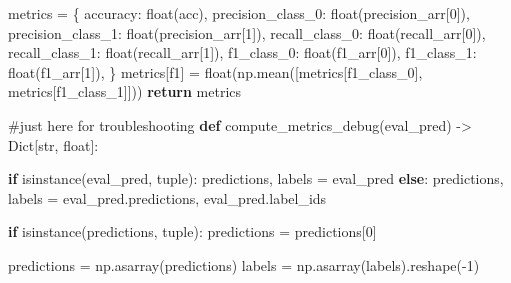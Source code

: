 \documentclass[
  letterpaper,
  DIV=11,
  numbers=noendperiod]{scrartcl}
\newenvironment{Shaded}{\begin{snugshade}}{\end{snugshade}}
\newcommand{\BuiltInTok}[1]{\textcolor[rgb]{0.00,0.23,0.31}{#1}}
\newcommand{\CommentTok}[1]{\textcolor[rgb]{0.37,0.37,0.37}{#1}}
\newcommand{\ControlFlowTok}[1]{\textcolor[rgb]{0.00,0.23,0.31}{\textbf{#1}}}
\newcommand{\DecValTok}[1]{\textcolor[rgb]{0.68,0.00,0.00}{#1}}
\newcommand{\KeywordTok}[1]{\textcolor[rgb]{0.00,0.23,0.31}{\textbf{#1}}}
\newcommand{\NormalTok}[1]{\textcolor[rgb]{0.00,0.23,0.31}{#1}}
\newcommand{\OperatorTok}[1]{\textcolor[rgb]{0.37,0.37,0.37}{#1}}
\newcommand{\StringTok}[1]{\textcolor[rgb]{0.13,0.47,0.30}{#1}}
\begin{document}
\begin{Shaded}
\begin{Highlighting}[]
\NormalTok{    metrics }\OperatorTok{=}\NormalTok{ \{}
        \StringTok{\textquotesingle{}accuracy\textquotesingle{}}\NormalTok{: }\BuiltInTok{float}\NormalTok{(acc),}
        \StringTok{\textquotesingle{}precision\_class\_0\textquotesingle{}}\NormalTok{: }\BuiltInTok{float}\NormalTok{(precision\_arr[}\DecValTok{0}\NormalTok{]),}
        \StringTok{\textquotesingle{}precision\_class\_1\textquotesingle{}}\NormalTok{: }\BuiltInTok{float}\NormalTok{(precision\_arr[}\DecValTok{1}\NormalTok{]),}
        \StringTok{\textquotesingle{}recall\_class\_0\textquotesingle{}}\NormalTok{: }\BuiltInTok{float}\NormalTok{(recall\_arr[}\DecValTok{0}\NormalTok{]),}
        \StringTok{\textquotesingle{}recall\_class\_1\textquotesingle{}}\NormalTok{: }\BuiltInTok{float}\NormalTok{(recall\_arr[}\DecValTok{1}\NormalTok{]),}
        \StringTok{\textquotesingle{}f1\_class\_0\textquotesingle{}}\NormalTok{: }\BuiltInTok{float}\NormalTok{(f1\_arr[}\DecValTok{0}\NormalTok{]),}
        \StringTok{\textquotesingle{}f1\_class\_1\textquotesingle{}}\NormalTok{: }\BuiltInTok{float}\NormalTok{(f1\_arr[}\DecValTok{1}\NormalTok{]),}
\NormalTok{    \}}
\NormalTok{    metrics[}\StringTok{\textquotesingle{}f1\textquotesingle{}}\NormalTok{] }\OperatorTok{=} \BuiltInTok{float}\NormalTok{(np.mean([metrics[}\StringTok{\textquotesingle{}f1\_class\_0\textquotesingle{}}\NormalTok{], metrics[}\StringTok{\textquotesingle{}f1\_class\_1\textquotesingle{}}\NormalTok{]]))}
    \ControlFlowTok{return}\NormalTok{ metrics}


\CommentTok{\#just here for troubleshooting}
\KeywordTok{def}\NormalTok{ compute\_metrics\_debug(eval\_pred) }\OperatorTok{{-}\textgreater{}}\NormalTok{ Dict[}\BuiltInTok{str}\NormalTok{, }\BuiltInTok{float}\NormalTok{]:}

    \ControlFlowTok{if} \BuiltInTok{isinstance}\NormalTok{(eval\_pred, }\BuiltInTok{tuple}\NormalTok{):}
\NormalTok{        predictions, labels }\OperatorTok{=}\NormalTok{ eval\_pred}
    \ControlFlowTok{else}\NormalTok{:}
\NormalTok{        predictions, labels }\OperatorTok{=}\NormalTok{ eval\_pred.predictions, eval\_pred.label\_ids}


    \ControlFlowTok{if} \BuiltInTok{isinstance}\NormalTok{(predictions, }\BuiltInTok{tuple}\NormalTok{):}
\NormalTok{        predictions }\OperatorTok{=}\NormalTok{ predictions[}\DecValTok{0}\NormalTok{]}

\NormalTok{    predictions }\OperatorTok{=}\NormalTok{ np.asarray(predictions)}
\NormalTok{    labels }\OperatorTok{=}\NormalTok{ np.asarray(labels).reshape(}\OperatorTok{{-}}\DecValTok{1}\NormalTok{)}


\end{Highlighting}
\end{Shaded}
\end{document}

